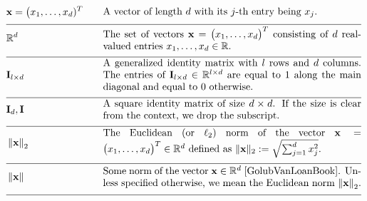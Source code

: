 \begin{align} 
	 &\featurevec=\big(\feature_{1},\ldots,\feature_{\featuredim})^{T} &\quad & \parbox{.75\textwidth}{A vector of length $\featuredim$ with its 
		$\featureidx$-th entry being $\feature_{\featureidx}$.} \nonumber \\[2mm] \hline \nonumber\\[-5mm]
	&\mathbb{R}^{\featuredim} & \quad &  \parbox{.75\textwidth}{The set of vectors $\featurevec=\big(\feature_{1},\ldots,\feature_{\featurelen}\big)^{T}$ consisting of $\featuredim$ real-valued entries $\feature_{1},\ldots,\feature_{\featurelen} \in \mathbb{R}$.} \nonumber \\[2mm] \hline \nonumber\\[-5mm]
	&\mathbf{I}_{\modelidx \times \featuredim}  & \quad &  \parbox{.75\textwidth}{A generalized identity matrix 
		with $\modelidx$ rows and $\featuredim$ columns. The entries of $\mathbf{I}_{\modelidx \times \featuredim} \in \mathbb{R}^{\modelidx \times \featuredim}$ 
		are equal to $1$ along the main diagonal and equal to $0$ otherwise. }\nonumber \\[2mm] \hline \nonumber\\[-5mm] %
	&\mathbf{I}_{\dimlocalmodel}, \mathbf{I} & \quad &  \parbox{.75\textwidth}{A square identity 
		matrix of size $\dimlocalmodel \times \dimlocalmodel$. If the size is clear from the 
		context, we drop the subscript.} \nonumber \\[2mm] \hline \nonumber\\[-5mm]
	&\normgeneric{\featurevec}{2}  &\quad & \parbox{.75\textwidth}{The Euclidean (or $\ell_{2}$) norm of the vector 
		$\featurevec=\big(\feature_{1},\ldots,\feature_{\featurelen}\big)^{T} \in \mathbb{R}^{\featuredim}$ defined as $ \| \featurevec \|_{2} \defeq \sqrt{\sum_{\featureidx=1}^{\featuredim} \feature_{\featureidx}^{2}}$.} \nonumber \\[2mm] \hline \nonumber\\[-5mm] 
	&\normgeneric{\featurevec}{}  & \quad &  \parbox{.75\textwidth}{Some norm of the vector $\featurevec \in \mathbb{R}^{\featuredim}$ \cite{GolubVanLoanBook}. Unless specified otherwise, we mean the Euclidean norm $\normgeneric{\featurevec}{2}$.} \nonumber \\[2mm] \hline \nonumber\\[-5mm]

\end{align}
